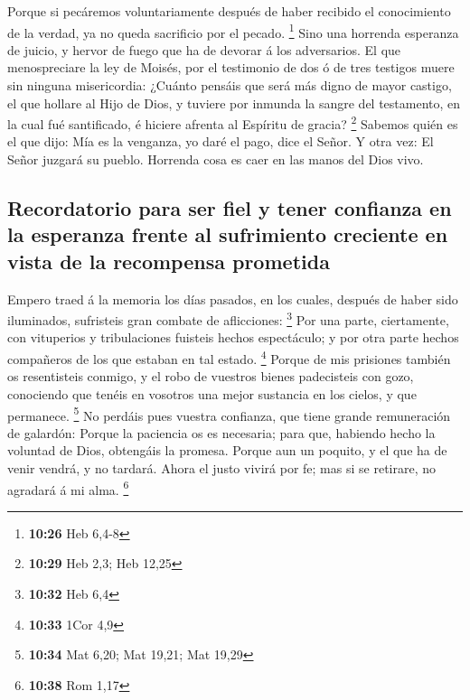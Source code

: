  Porque si pecáremos voluntariamente después de haber
recibido el conocimiento de la verdad, ya no queda sacrificio por el
pecado. \footnote{\textbf{10:26} Heb 6,4-8}  Sino una
horrenda esperanza de juicio, y hervor de fuego que ha de devorar á los
adversarios.  El que menospreciare la ley de Moisés, por el
testimonio de dos ó de tres testigos muere sin ninguna misericordia:
 ¿Cuánto pensáis que será más digno de mayor castigo, el
que hollare al Hijo de Dios, y tuviere por inmunda la sangre del
testamento, en la cual fué santificado, é hiciere afrenta al Espíritu de
gracia? \footnote{\textbf{10:29} Heb 2,3; Heb 12,25} 
Sabemos quién es el que dijo: Mía es la venganza, yo daré el pago, dice
el Señor. Y otra vez: El Señor juzgará su pueblo.  Horrenda
cosa es caer en las manos del Dios vivo.

\hypertarget{recordatorio-para-ser-fiel-y-tener-confianza-en-la-esperanza-frente-al-sufrimiento-creciente-en-vista-de-la-recompensa-prometida}{%
\subsection{Recordatorio para ser fiel y tener confianza en la esperanza
frente al sufrimiento creciente en vista de la recompensa
prometida}\label{recordatorio-para-ser-fiel-y-tener-confianza-en-la-esperanza-frente-al-sufrimiento-creciente-en-vista-de-la-recompensa-prometida}}

 Empero traed á la memoria los días pasados, en los cuales,
después de haber sido iluminados, sufristeis gran combate de
aflicciones: \footnote{\textbf{10:32} Heb 6,4}  Por una
parte, ciertamente, con vituperios y tribulaciones fuisteis hechos
espectáculo; y por otra parte hechos compañeros de los que estaban en
tal estado. \footnote{\textbf{10:33} 1Cor 4,9}  Porque de
mis prisiones también os resentisteis conmigo, y el robo de vuestros
bienes padecisteis con gozo, conociendo que tenéis en vosotros una mejor
sustancia en los cielos, y que permanece. \footnote{\textbf{10:34} Mat
  6,20; Mat 19,21; Mat 19,29}  No perdáis pues vuestra
confianza, que tiene grande remuneración de galardón: 
Porque la paciencia os es necesaria; para que, habiendo hecho la
voluntad de Dios, obtengáis la promesa.  Porque aun un
poquito, y el que ha de venir vendrá, y no tardará.  Ahora
el justo vivirá por fe; mas si se retirare, no agradará á mi alma.
\footnote{\textbf{10:38} Rom 1,17}


